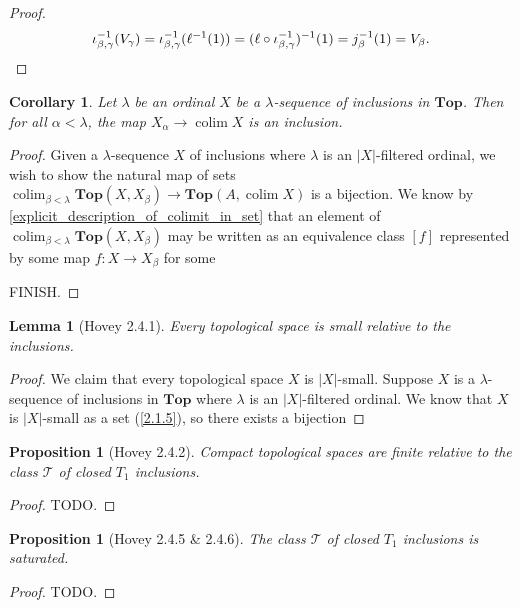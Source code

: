 \documentclass{amsart}
\theoremstyle{plain}
\newtheorem{corollary}[theorem]{Corollary}
\newtheorem{proposition}[theorem]{Proposition}
\newtheorem{lemma}[theorem]{Lemma}
\theoremstyle{definition}
\newcommand{\Top}{\mbf{Top}}
\newcommand{\0}{\mathbf{0}}
\newcommand{\cT}{\mathcal T}
\newcommand{\mbf}[1]{\mathbf{#1}}
\renewcommand{\(}{\left(}
\renewcommand{\)}{\right)}
\DeclareMathOperator*{\colim}{colim}
\begin{document}
\begin{enumerate}[label=(\arabic*),listparindent=\parindent,parsep=5pt]
\begin{proof}
    \[\iota_{\beta,\gamma}^{-1}(V_\gamma)=\iota_{\beta,\gamma}^{-1}(\ell^{-1}(1))=(\ell\circ\iota_{\beta,\gamma}^{-1})^{-1}(1)=j_\beta^{-1}(1)=V_\beta.\qedhere\]
  \end{proof}
\end{enumerate}

\begin{corollary}\label{inclusions_closed_under_transfinite_composition}
  Let $\lambda$ be an ordinal $X$ be a $\lambda$-sequence of inclusions in $\Top$. Then for all $\alpha<\lambda$, the map $X_\alpha\to\colim X$ is an inclusion.
\end{corollary}
\begin{proof}
  Given a $\lambda$-sequence $X$ of inclusions where $\lambda$ is an $|X|$-filtered ordinal, we wish to show the natural map of sets $\colim_{\beta<\lambda}\Top(X,X_\beta)\to\Top(A,\colim X)$ is a bijection. We know by \autoref{explicit_description_of_colimit_in_set} that an element of $\colim_{\beta<\lambda}\Top(X,X_\beta)$ may be written as an equivalence class $[f]$ represented by some map $f:X\to X_\beta$ for some 

  \color{red}FINISH.
\end{proof}

\begin{lemma}[Hovey 2.4.1]\label{2.4.1}
  Every topological space is small relative to the inclusions.
\end{lemma}
\begin{proof}
  We claim that every topological space $X$ is $|X|$-small. Suppose $X$ is a $\lambda$-sequence of inclusions in $\Top$ where $\lambda$ is an $|X|$-filtered ordinal. We know that $X$ is $|X|$-small as a set (\autoref{2.1.5}), so there exists a bijection 
\end{proof}

\begin{proposition}[Hovey 2.4.2]\label{2.4.2}
  Compact topological spaces are finite relative to the class $\cT$ of closed $T_1$ inclusions.
\end{proposition}
\begin{proof}
  \color{red}TODO.
\end{proof}

\begin{proposition}[Hovey 2.4.5 \& 2.4.6]\label{2.4.5-6}
  The class $\cT$ of closed $T_1$ inclusions is saturated.
\end{proposition}
\begin{proof}
  \color{red}TODO.
\end{proof}
\end{document}
